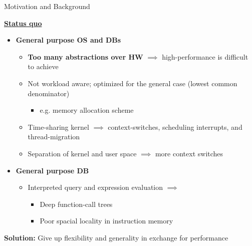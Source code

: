 \begin{block}{Motivation and Background}

\underline{\textbf{Status quo}}
  \begin{itemize}
  \item \textbf{General purpose OS and DBs}%
    \begin{itemize}
     \item \textbf{Too many abstractions over HW} $\implies$ high-performance is difficult
      to achieve~\cite{GICEVA:2016:OS_SUPPORT,HALE:2015:NAUTILUS}
    \item Not workload aware; optimized for the general case (lowest common denominator)
      \begin{itemize}
      \item e.g. memory allocation scheme
      \end{itemize}
    \item Time-sharing kernel $\implies$ context-switches, scheduling interrupts, and thread-migration
    \item Separation of kernel and user space $\implies$ more context switches
    \end{itemize}
  \item \textbf{General purpose DB}
    \begin{itemize}
    \item Interpreted query and expression evaluation  $\implies$
      \begin{itemize}
      \item Deep function-call trees
      \item Poor spacial locality in instruction memory
    \end{itemize}
    \end{itemize}
  \end{itemize}

  \begin{center}
    \alert{\textbf{Solution:} Give up flexibility and generality in exchange for performance}
  \end{center}
   

\end{block}
